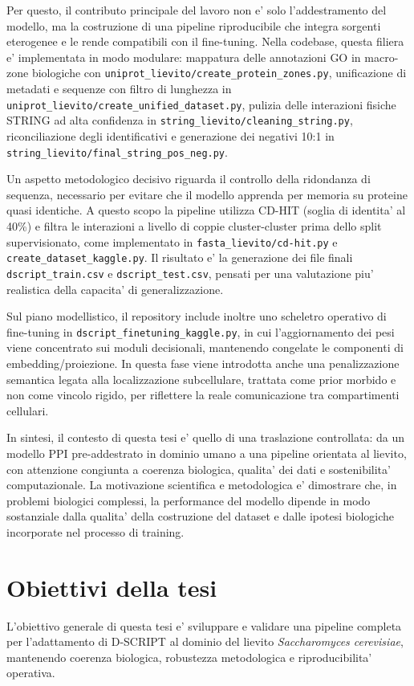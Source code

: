 \documentclass[12pt,a4paper,oneside]{report} %
\begin{document}
Per questo, il contributo principale del lavoro non e' solo l'addestramento del modello, ma la costruzione di una pipeline riproducibile che integra sorgenti eterogenee e le rende compatibili con il fine-tuning. Nella codebase, questa filiera e' implementata in modo modulare: mappatura delle annotazioni GO in macro-zone biologiche con \texttt{uniprot\_lievito/create\_protein\_zones.py}, unificazione di metadati e sequenze con filtro di lunghezza in \texttt{uniprot\_lievito/create\_unified\_dataset.py}, pulizia delle interazioni fisiche STRING ad alta confidenza in \texttt{string\_lievito/cleaning\_string.py}, riconciliazione degli identificativi e generazione dei negativi 10:1 in \texttt{string\_lievito/final\_string\_pos\_neg.py}.

Un aspetto metodologico decisivo riguarda il controllo della ridondanza di sequenza, necessario per evitare che il modello apprenda per memoria su proteine quasi identiche. A questo scopo la pipeline utilizza CD-HIT (soglia di identita' al 40\%) e filtra le interazioni a livello di coppie cluster-cluster prima dello split supervisionato, come implementato in \texttt{fasta\_lievito/cd-hit.py} e \texttt{create\_dataset\_kaggle.py}. Il risultato e' la generazione dei file finali \texttt{dscript\_train.csv} e \texttt{dscript\_test.csv}, pensati per una valutazione piu' realistica della capacita' di generalizzazione.

Sul piano modellistico, il repository include inoltre uno scheletro operativo di fine-tuning in \texttt{dscript\_finetuning\_kaggle.py}, in cui l'aggiornamento dei pesi viene concentrato sui moduli decisionali, mantenendo congelate le componenti di embedding/proiezione. In questa fase viene introdotta anche una penalizzazione semantica legata alla localizzazione subcellulare, trattata come prior morbido e non come vincolo rigido, per riflettere la reale comunicazione tra compartimenti cellulari.

In sintesi, il contesto di questa tesi e' quello di una traslazione controllata: da un modello PPI pre-addestrato in dominio umano a una pipeline orientata al lievito, con attenzione congiunta a coerenza biologica, qualita' dei dati e sostenibilita' computazionale. La motivazione scientifica e metodologica e' dimostrare che, in problemi biologici complessi, la performance del modello dipende in modo sostanziale dalla qualita' della costruzione del dataset e dalle ipotesi biologiche incorporate nel processo di training.
\section{Obiettivi della tesi}
L'obiettivo generale di questa tesi e' sviluppare e validare una pipeline completa per l'adattamento di D-SCRIPT al dominio del lievito \textit{Saccharomyces cerevisiae}, mantenendo coerenza biologica, robustezza metodologica e riproducibilita' operativa.
\end{document}
